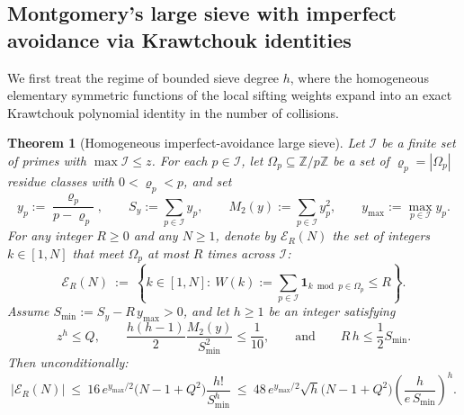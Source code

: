 \documentclass[11pt, a4paper]{article}
\theoremstyle{plain}
\newtheorem{theorem}{Theorem}[section]
\theoremstyle{definition}
\newcommand{\Z}{\mathbb{Z}}
\begin{document}
\subsection{Montgomery's large sieve with imperfect avoidance via Krawtchouk identities}\label{subsec:homogeneous_imperfect_ls}

We first treat the regime of bounded sieve degree $h$, where the homogeneous elementary symmetric functions of the local sifting weights expand into an exact Krawtchouk polynomial identity in the number of collisions.

\begin{theorem}[Homogeneous imperfect-avoidance large sieve]\label{thm:imperfect_large_sieve}
Let $\mathcal{I}$ be a finite set of primes with $\max\mathcal{I}\le z$. For each $p\in\mathcal{I}$, let $\Omega_p\subseteq\Z/p\Z$ be a set of $\varrho_p=|\Omega_p|$ residue classes with $0<\varrho_p<p$, and set
$$y_p:=\frac{\varrho_p}{p-\varrho_p},\qquad S_y:=\sum_{p\in\mathcal{I}}y_p,\qquad M_2(y):=\sum_{p\in\mathcal{I}}y_p^{2},\qquad y_{\max}:=\max_{p\in\mathcal{I}}y_p.$$
For any integer $R\ge0$ and any $N\ge1$, denote by $\mathcal{E}_R(N)$ the set of integers $k\in[1,N]$ that meet $\Omega_p$ at most $R$ times across $\mathcal{I}$:
$$\mathcal{E}_R(N)\ :=\ \left\{k\in[1,N]:\ W(k):=\sum_{p\in\mathcal{I}}\mathbf{1}_{k\bmod p\in\Omega_p}\le R\right\}.$$
Assume $S_{\min}:=S_y-R\,y_{\max}>0$, and let $h\ge1$ be an integer satisfying
\begin{equation}\label{eq:h_imperfect_conditions}
z^{h}\le Q,\qquad \frac{h(h-1)}{2}\frac{M_2(y)}{S_{\min}^{2}}\le\frac{1}{10},\qquad\text{and}\qquad R\,h\le\frac12 S_{\min}.
\end{equation}
Then unconditionally:
\begin{equation}\label{eq:imperfect_large_sieve_bound}
|\mathcal{E}_R(N)|\ \le\ 16\,e^{y_{\max}/2}\big(N-1+Q^{2}\big)\frac{h!}{S_{\min}^{h}}\ \le\ 48\,e^{y_{\max}/2}\sqrt{h}\big(N-1+Q^{2}\big)\left(\frac{h}{e\,S_{\min}}\right)^{h}.
\end{equation}
\end{theorem}
\end{document}
